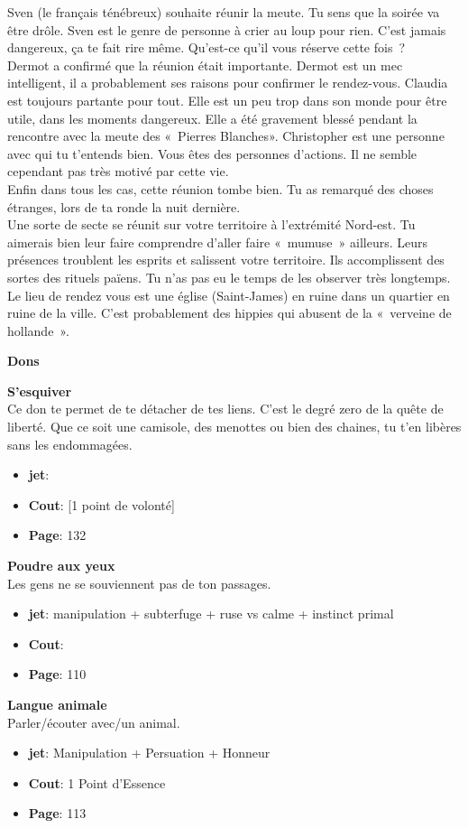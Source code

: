 \documentclass[oneside,12pt]{book}
\newcommand\don[5]{
\textbf{#1} \\
#2
\begin{itemize}
\item{ \textbf{jet}: #3}
\item{ \textbf{Cout}: #4}
\item{ \textbf{Page}: #5}
\end{itemize}
\vspace{0.5cm}
}
\begin{document}
\begin{flushleft}
\begin{description}
{Sven (le français ténébreux) souhaite réunir la meute. Tu sens que la soirée va être drôle. Sven est le genre de personne à crier au loup pour rien. C'est jamais dangereux, ça te fait rire même. Qu'est-ce qu'il vous réserve cette fois ? \\
Dermot a confirmé que la réunion était importante. Dermot est un mec intelligent, il a probablement ses raisons pour confirmer le rendez-vous. Claudia est toujours partante pour tout. Elle est un peu trop dans son monde pour être utile, dans les moments dangereux. Elle a été gravement blessé pendant la rencontre avec la meute des « Pierres Blanches». Christopher est une personne avec qui tu t'entends bien. Vous êtes des personnes d'actions. Il ne semble cependant pas très motivé par cette vie. \\
Enfin dans tous les cas, cette réunion tombe bien. Tu as remarqué des choses étranges, lors de ta ronde la nuit dernière. \\
Une  sorte de secte se réunit sur votre territoire à l'extrémité Nord-est. Tu aimerais bien leur faire comprendre d'aller faire « mumuse » ailleurs. 
Leurs présences troublent les esprits et salissent votre territoire. Ils accomplissent des sortes des rituels païens.  
Tu n'as pas eu le temps de les observer très longtemps. 
Le lieu de rendez vous est une église (Saint-James) en ruine dans un quartier en ruine de la ville. C'est probablement des hippies qui abusent de la « verveine de hollande ».
}
\end{description}
\clearpage
\textbf{\large Dons} 
\vspace{0.5cm}

\don{S'esquiver}{Ce don te permet de te détacher de tes liens. C'est le degré zero de la quête de liberté. Que ce soit une camisole, des menottes ou bien des chaines, tu t'en libères sans les endommagées.}{}{[1 point de volonté]}{132}
\don{Poudre aux yeux}{Les gens ne se souviennent pas de ton passages. }{ manipulation + subterfuge + ruse vs calme + instinct primal}{}{110}
\don{Langue animale}{Parler/écouter avec/un animal. }{Manipulation + Persuation + Honneur}{1 Point d'Essence}{113}


\clearpage

\end{flushleft}
\end{document}
